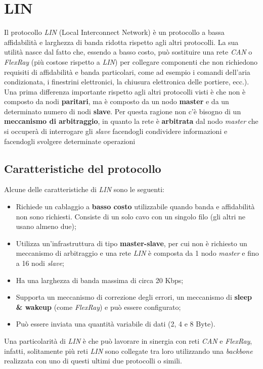 \section{LIN}
Il protocollo \emph{LIN} (Local Interconnect Network) è un protocollo a bassa affidabilità e larghezza di banda ridotta rispetto agli altri protocolli. La sua utilità nasce dal fatto che, essendo a basso costo, può sostituire una rete \emph{CAN} o \emph{FlexRay} (più costose rispetto a \emph{LIN}) per collegare componenti che non richiedono requisiti di affidabilità e banda particolari, come ad esempio i comandi dell'aria condizionata, i finestrini elettronici, la chiusura elettronica delle portiere, ecc.). Una prima differenza importante rispetto agli altri protocolli visti è che non è composto da nodi \textbf{paritari}, ma è composto da un nodo \textbf{master} e da un determinato numero di nodi \textbf{slave}. Per questa ragione non c'è bisogno di un \textbf{meccanismo di arbitraggio}, in quanto la rete è \textbf{arbitrata} dal nodo \emph{master} che si occuperà di interrogare gli \emph{slave} facendogli condividere informazioni e facendogli svolgere determinate operazioni
\subsection{Caratteristiche del protocollo}
Alcune delle caratteristiche di \emph{LIN} sono le seguenti:
\begin{itemize}
    \item Richiede un cablaggio a \textbf{basso costo} utilizzabile quando banda e affidabilità non sono richiesti. Consiste di un solo cavo con un singolo filo (gli altri ne usano almeno due);
    \item Utilizza un'infrastruttura di tipo \textbf{master-slave}, per cui non è richiesto un meccanismo di arbitraggio e una rete \emph{LIN} è composta da 1 nodo \emph{master} e fino a 16 nodi \emph{slave};
    \item Ha una larghezza di banda massima di circa 20 Kbps;
    \item Supporta un meccanismo di correzione degli errori, un meccanismo di \textbf{sleep \& wakeup} (come \emph{FlexRay}) e può essere configurato; \cite{css_electronics_lin}
    \item Può essere inviata una quantità variabile di dati (2, 4 e 8 Byte). \cite{wikipedia_lin}
\end{itemize}

Una particolarità di \emph{LIN} è che può lavorare in sinergia con reti \emph{CAN} e \emph{FlexRay}, infatti, solitamente più reti \emph{LIN} sono collegate tra loro utilizzando una \emph{backbone} realizzata con uno di questi ultimi due protocolli o simili.

